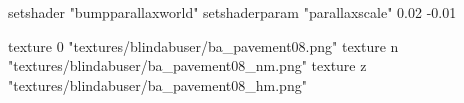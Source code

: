 	setshader "bumpparallaxworld"
	setshaderparam "parallaxscale" 0.02 -0.01

		texture 0 "textures/blindabuser/ba_pavement08.png"
		texture n "textures/blindabuser/ba_pavement08_nm.png"
		texture z "textures/blindabuser/ba_pavement08_hm.png"

